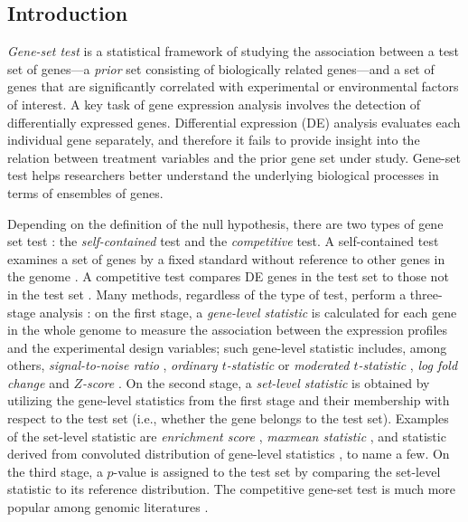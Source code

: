 	\subsection{Introduction}\label{section:introduction}
	
	\textit{Gene-set test} is a statistical framework of studying the association between a test
	set of genes---a \textit{prior} set consisting of biologically related genes---and a set of 
	genes that 
	are
	significantly correlated with experimental or environmental factors of interest. A key task of 
	gene expression analysis involves the detection of differentially expressed genes. Differential
	expression (DE) analysis  evaluates each individual gene separately, and therefore it fails to
	provide insight into the relation between treatment variables and the prior gene set under 
	study.
	Gene-set test helps researchers better understand the underlying biological processes in terms 
	of
	ensembles of genes.
	
	Depending on the definition of the null hypothesis, there are two types of gene set test
	\citep{goeman2007analyzing}: the \textit{self-contained} test and the \textit{competitive} 
	test. A
	self-contained test examines a set of genes by a fixed standard without reference to other 
	genes in
	the genome 
	\citep{goeman2005testing,goeman2004global,huang2013gene,tsai2009multivariate,wu2010roast}. A 
	competitive test compares DE genes in the test set to those not in the test set 
	\citep{tian2005discovering,wu2012camera,yaari2013quantitative}. Many methods, regardless of the 
	type of test, perform a three-stage analysis
	\citep{khatri2012ten}: on the first stage, a \textit{gene-level statistic} is calculated for 
	each
	gene in the whole genome to measure the association between the expression profiles and the
	experimental design variables; such gene-level statistic includes, among others,
	\textit{signal-to-noise ratio} \citep{subramanian2005gene}, \textit{ordinary $t$-statistic}
	\citep{tian2005discovering} or \textit{moderated $t$-statistic} \citep{Smyth2004moderated},
	\textit{log fold change} \citep{kim2005page} and \textit{$Z$-score} 
	\citep{efron2007correlation}. On
	the second stage, a \textit{set-level statistic} is obtained by utilizing the gene-level 
	statistics
	from the first stage and their membership with respect to the test set (i.e., whether the gene
	belongs to the test set). Examples of the set-level statistic are \textit{enrichment score}
	\citep{subramanian2005gene}, \textit{maxmean statistic} \citep{efron2007testing}, and statistic
	derived from convoluted distribution of gene-level statistics \citep{yaari2013quantitative}, to 
	name
	a few. On the third stage, a $p$-value is assigned to the test set by comparing the set-level
	statistic to its reference distribution. The competitive gene-set test is much more popular 
	among
	genomic literatures \citep{gatti2010heading,goeman2007analyzing}.  
	
